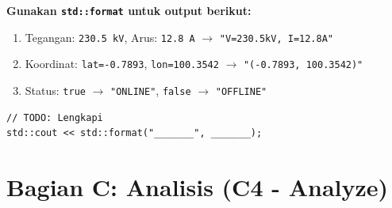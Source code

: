 \documentclass[12pt,a4paper]{article}
\begin{document}
\vspace{0.5cm}

\begin{tcolorbox}[colback=UBgreen!5, colframe=UBgreen, title=\textbf{B3. std::format (C3: Apply)}]
\textbf{Gunakan \texttt{std::format} untuk output berikut:}

\begin{enumerate}[label=\alph*)]
  \item Tegangan: \texttt{230.5 kV}, Arus: \texttt{12.8 A} $\rightarrow$ \texttt{"V=230.5kV, I=12.8A"}
  \item Koordinat: \texttt{lat=-0.7893}, \texttt{lon=100.3542} $\rightarrow$ \texttt{"(-0.7893, 100.3542)"}
  \item Status: \texttt{true} $\rightarrow$ \texttt{"ONLINE"}, \texttt{false} $\rightarrow$ \texttt{"OFFLINE"}
\end{enumerate}

\begin{lstlisting}
// TODO: Lengkapi
std::cout << std::format("_______", _______);
\end{lstlisting}
\end{tcolorbox}

\section*{Bagian C: Analisis (C4 - Analyze)}
\end{document}
